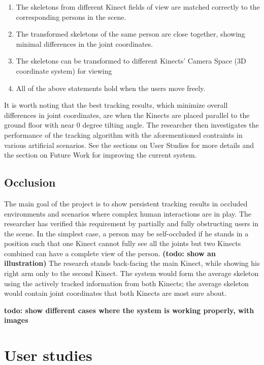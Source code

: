 \documentclass{sigchi}
\begin{document}
\begin{enumerate}
  \item The skeletons from different Kinect fields of view are matched correctly to the corresponding persons in the scene.
  \item The transformed skeletons of the same person are close together, showing minimal differences in the joint coordinates.
  \item The skeletons can be transformed to different Kinects' Camera Space (3D coordinate system) for viewing
  \item All of the above statements hold when the users move freely.
\end{enumerate}

It is worth noting that the best tracking results, which minimize overall differences in joint coordinates, are when the Kinects are placed parallel to the ground floor with near 0 degree tilting angle. The researcher then investigates the performance of the tracking algorithm with the aforementioned contraints in various artificial scenarios. See the sections on User Studies for more details and the section on Future Work for improving the current system.

\subsection{Occlusion}

The main goal of the project is to show persistent tracking results in occluded environments and scenarios where complex human interactions are in play. The researcher has verified this requirement by partially and fully obstructing users in the scene. In the simplest case, a person may be self-occluded if he stands in a position such that one Kinect cannot fully see all the joints but two Kinects combined can have a complete view of the person. \textbf{(todo: show an illustration)} The research stands back-facing the main Kinect, while showing his right arm only to the second Kinect. The system would form the average skeleton using the actively tracked information from both Kinects; the average skeleton would contain joint coordinates that both Kinects are most sure about.

\textbf{todo: show different cases where the system is working properly, with images}

\section{User studies}
\label{sec:user_studies}
\end{document}
